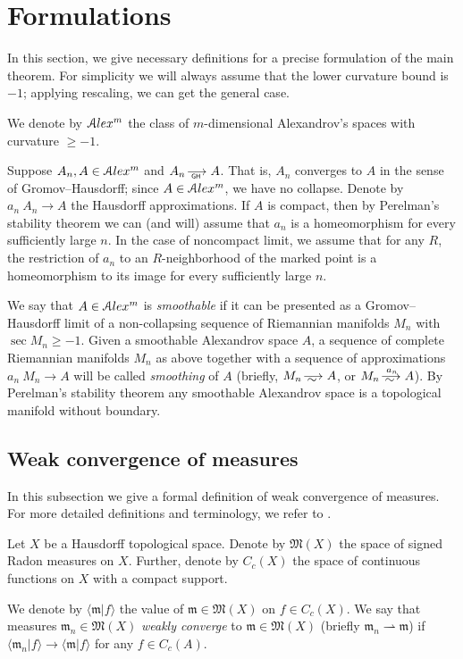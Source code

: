 \section{Formulations}

In this section, we give necessary definitions for a precise formulation of the main theorem.
For simplicity  we will always assume that the lower
curvature bound is  $-1$;
applying rescaling, we can get the general case.

We denote by
$\mathcal{A}lex^m$ the class of $m$-dimensional Alexandrov's spaces
with curvature $\ge -1$.

Suppose $A_n, A\in \mathcal{A}lex^m$ and $A_n\GHto A$.
That is, $A_n$ converges to 
$A$ in the sense of Gromov--Hausdorff;
since $A\in \mathcal{A}lex^m$, we have no collapse.
Denote by $a_n\:A_n\to A$ the Hausdorff approximations.
If $A$ is compact, then
by Perelman's stability theorem \cite{PerStab,KapStab} we can (and will) assume that $a_n$ is a homeomorphism for every sufficiently large $n$.
In the case of noncompact limit, we assume that for any $R$, the restriction of $a_n$ to an $R$-neighborhood of the marked point is a homeomorphism to its image for every sufficiently large $n$.

We say that $A\in \mathcal{A}lex^m$ is \emph{smoothable}
if it can be presented as a Gromov--Hausdorff limit of a non-collapsing sequence of Riemannian manifolds $M_n$ with $\sec M_n\ge-1$.
Given a smoothable Alexandrov space $A$,
a sequence of complete Riemannian manifolds $M_n$ as above
together with a sequence of approximations $a_n\:M_n\to A$
will be called \emph{smoothing} of $A$
(briefly, $M_n\smooths{} A$, or $M_n\smooths{a_n} A$).
By Perelman's stability theorem any smoothable Alexandrov space is a topological manifold without boundary.

\subsection{Weak convergence of measures}

In this subsection we give a formal definition of weak convergence of measures.
For more detailed definitions and terminology, we refer to
\cite{GMS}.

Let $X$ be a Hausdorff topological space.
Denote by $\mathfrak M(X)$ the space of signed Radon measures on $X$.
Further, denote by $C_c(X)$  the space of continuous functions on $X$
with a compact support. 

We  denote by $\langle \mathfrak m|f\rangle $ the value of $\mathfrak m\in\mathfrak M(X)$ on $f\in C_c(X)$.
We say that measures $\mathfrak m_n\in \mathfrak M(X)$ \emph{weakly converge} to $\mathfrak m\in \mathfrak M(X)$ (briefly
$\mathfrak m_n\rightharpoonup \mathfrak m$) if $\langle \mathfrak m_n|f\rangle \to \langle \mathfrak m|f\rangle $ for any $f\in C_c(A)$.

